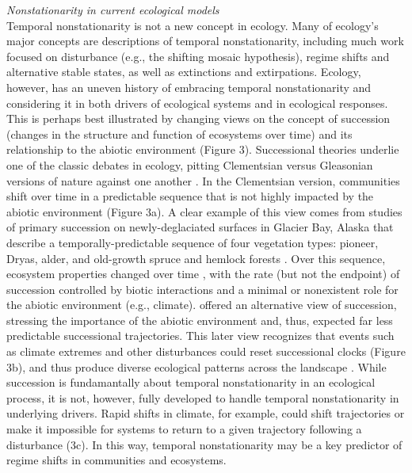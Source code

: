 \documentclass[11pt,a4paper,oneside]{article}
\begin{document}
\noindent \emph{Nonstationarity in current ecological models}\\
\noindent Temporal nonstationarity is not a new concept in ecology. Many of ecology's major concepts are descriptions of temporal nonstationarity, including much work focused on disturbance (e.g., the shifting mosaic hypothesis), regime shifts and alternative stable states, as well as extinctions and extirpations. Ecology, however, has an uneven history of embracing temporal nonstationarity and considering it in both drivers of ecological systems and in ecological responses. This is perhaps best illustrated by changing views on the concept of succession (changes in the structure and function of ecosystems over time) and its relationship to the abiotic environment (Figure 3). Successional theories underlie one of the classic debates in ecology, pitting Clementsian versus Gleasonian versions of nature against one another \citep{clementsbook,gleason1926}. In the Clementsian version, communities shift over time in a predictable sequence that is not highly impacted by the abiotic environment (Figure 3a). A clear example of this view comes from studies of primary succession on newly-deglaciated surfaces in Glacier Bay, Alaska that describe a temporally-predictable sequence of four vegetation types: pioneer, Dryas, alder, and old-growth spruce and hemlock forests \citep{cooper1923}. Over this sequence, ecosystem properties changed over time \citep{Chapin1994}, with the rate (but not the endpoint) of succession controlled by biotic interactions and a minimal or nonexistent role for the abiotic environment (e.g., climate). \citet{gleason1926} offered an alternative view of succession, stressing the importance of the abiotic environment and, thus, expected far less predictable successional trajectories. This later view recognizes that events such as climate extremes and other disturbances could reset successional clocks (Figure 3b), and thus produce diverse ecological patterns across the landscape \citep{Levin:1992rg,romme2011}. While succession is fundamantally about temporal nonstationarity in an ecological process, it is not, however, fully developed to handle temporal nonstationarity in underlying drivers. Rapid shifts in climate, for example, could shift trajectories or make it impossible for systems to return to a given trajectory following a disturbance (3c). In this way, temporal nonstationarity may be a key predictor of regime shifts in communities and ecosystems.
\end{document}
